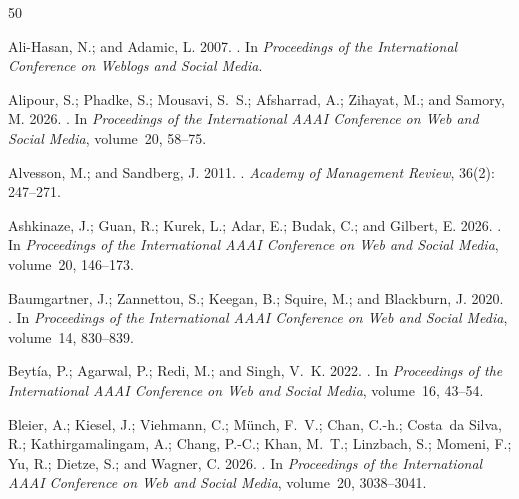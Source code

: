 \begin{thebibliography}{50}
\providecommand{\natexlab}[1]{#1}

Ali-Hasan, N.; and Adamic, L. 2007.
.
\newblock In \emph{Proceedings of the International Conference on Weblogs and Social Media}.

Alipour, S.; Phadke, S.; Mousavi, S.~S.; Afsharrad, A.; Zihayat, M.; and Samory, M. 2026.
.
\newblock In \emph{Proceedings of the International AAAI Conference on Web and Social Media}, volume~20, 58--75.

Alvesson, M.; and Sandberg, J. 2011.
.
\newblock \emph{Academy of Management Review}, 36(2): 247--271.

Ashkinaze, J.; Guan, R.; Kurek, L.; Adar, E.; Budak, C.; and Gilbert, E. 2026.
.
\newblock In \emph{Proceedings of the International AAAI Conference on Web and Social Media}, volume~20, 146--173.

Baumgartner, J.; Zannettou, S.; Keegan, B.; Squire, M.; and Blackburn, J. 2020.
.
\newblock In \emph{Proceedings of the International AAAI Conference on Web and Social Media}, volume~14, 830--839.

Beyt{\'{i}}a, P.; Agarwal, P.; Redi, M.; and Singh, V.~K. 2022.
.
\newblock In \emph{Proceedings of the International AAAI Conference on Web and Social Media}, volume~16, 43--54.

Bleier, A.; Kiesel, J.; Viehmann, C.; M{\"{u}}nch, F.~V.; Chan, C.-h.; Costa~da Silva, R.; Kathirgamalingam, A.; Chang, P.-C.; Khan, M.~T.; Linzbach, S.; Momeni, F.; Yu, R.; Dietze, S.; and Wagner, C. 2026.
.
\newblock In \emph{Proceedings of the International AAAI Conference on Web and Social Media}, volume~20, 3038--3041.


\end{thebibliography}
